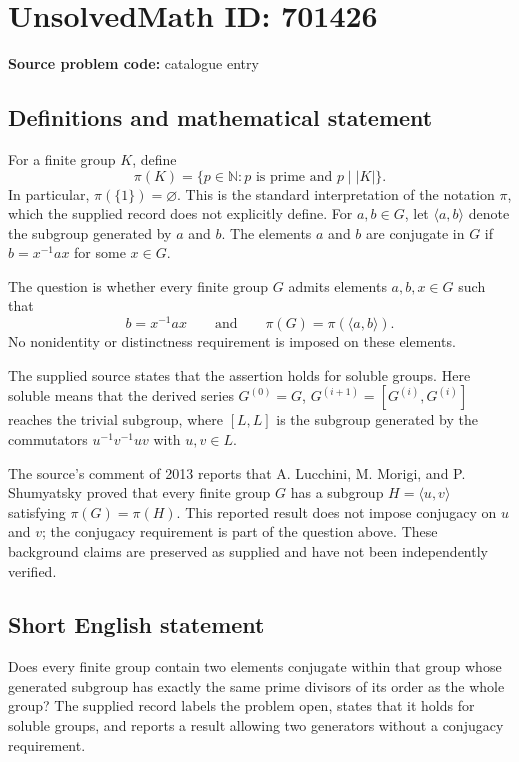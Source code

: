 \documentclass[11pt]{article}
\newcommand{\N}{\mathbb{N}}
\begin{document}
\section*{UnsolvedMath ID: 701426}
\textbf{Source problem code:} catalogue entry
\subsection{Definitions and mathematical statement}
For a finite group \(K\), define
\[
\pi(K)=\{p\in\N:p\text{ is prime and }p\mid |K|\}.
\]
In particular, \(\pi(\{1\})=\varnothing\). This is the standard interpretation of the notation \(\pi\), which the supplied record does not explicitly define. For \(a,b\in G\), let \(\langle a,b\rangle\) denote the subgroup generated by \(a\) and \(b\). The elements \(a\) and \(b\) are conjugate in \(G\) if \(b=x^{-1}ax\) for some \(x\in G\).

The question is whether every finite group \(G\) admits elements \(a,b,x\in G\) such that
\[
b=x^{-1}ax
\qquad\text{and}\qquad
\pi(G)=\pi(\langle a,b\rangle).
\]
No nonidentity or distinctness requirement is imposed on these elements.

The supplied source states that the assertion holds for soluble groups. Here soluble means that the derived series \(G^{(0)}=G\), \(G^{(i+1)}=[G^{(i)},G^{(i)}]\) reaches the trivial subgroup, where \([L,L]\) is the subgroup generated by the commutators \(u^{-1}v^{-1}uv\) with \(u,v\in L\).

The source's comment of 2013 reports that A. Lucchini, M. Morigi, and P. Shumyatsky proved that every finite group \(G\) has a subgroup \(H=\langle u,v\rangle\) satisfying \(\pi(G)=\pi(H)\). This reported result does not impose conjugacy on \(u\) and \(v\); the conjugacy requirement is part of the question above. These background claims are preserved as supplied and have not been independently verified.
\subsection{Short English statement}
Does every finite group contain two elements conjugate within that group whose generated subgroup has exactly the same prime divisors of its order as the whole group? The supplied record labels the problem open, states that it holds for soluble groups, and reports a result allowing two generators without a conjugacy requirement.
\end{document}
